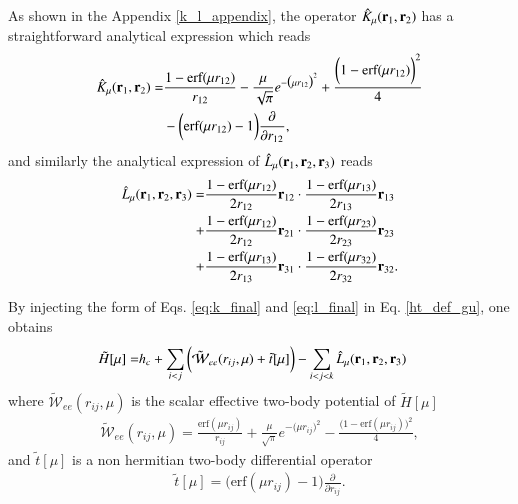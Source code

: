 \documentclass[aip,jcp,reprint,noshowkeys,superscriptaddress,twocolumn]{revtex4-1}
\newcommand{\deriv}[3]{\frac{\partial^{#3} #1}{\partial {#2}^{#3}}}
\newcommand{\bri}[1]{{\bf r}_{#1}}
\begin{document}
As shown in the Appendix \ref{k_l_appendix}, the operator $\hat{K}_\mu(\bri{1},\bri{2})$ has a straightforward analytical expression which reads 
\begin{equation}
 \label{eq:k_final}
  \begin{aligned}
   \hat{K}_\mu(\bri{1},\bri{2}) = & \frac{1 - \text{erf}(\mu r_{12})}{r_{12}} - \frac{\mu}{\sqrt{\pi}} e^{-\big(\mu r_{12} \big)^2} + \frac{\bigg(1 -     \text{erf}(\mu r_{12}) \bigg)^2}{4} \\
& - \bigg( \text{erf}(\mu r_{12}) - 1\bigg) \deriv{}{r_{12}}{},
  \end{aligned}
\end{equation}
and similarly the analytical expression of $\hat{L}_\mu(\bri{1},\bri{2},\bri{3}) $ reads 
\begin{equation}
 \label{eq:l_final}
 \begin{aligned}
 \hat{L}_\mu(\bri{1},\bri{2},\bri{3}) = & \frac{1 - \text{erf}(\mu r_{12})}{2 r_{12}} \bri{12} \cdot \frac{1 - \text{erf}(\mu r_{13})}{2 r_{13}} \bri{13} \\
                                      + & \frac{1 - \text{erf}(\mu r_{12})}{2 r_{12}} \bri{21} \cdot \frac{1 - \text{erf}(\mu r_{23})}{2 r_{23}} \bri{23} \\
                                      + & \frac{1 - \text{erf}(\mu r_{13})}{2 r_{13}} \bri{31} \cdot \frac{1 - \text{erf}(\mu r_{32})}{2 r_{32}} \bri{32}.
 \end{aligned}                    
\end{equation}

By injecting the form of Eqs. \eqref{eq:k_final} and \eqref{eq:l_final} in Eq. \eqref{ht_def_gu}, one obtains 
\begin{equation}
  \begin{aligned}
 \label{eq:exp_ht_mu}
   \tilde{H}[\mu] = & h_c + \sum_{i<j} \bigg( \tilde{\mathcal{W}}_{ee}(r_{ij},\mu) + \tilde{t}[\mu] \bigg) - \sum_{i<j<k} \hat{L}_\mu(\bri{1},\bri{2},\bri{3})
  \end{aligned}
\end{equation}
where $ \tilde{\mathcal{W}}_{ee}(r_{ij},\mu)$ is the scalar effective two-body potential of  $\tilde{H}[\mu]$
\begin{equation}
 \begin{aligned}
 \tilde{\mathcal{W}}_{ee}(r_{ij},\mu)  =  \frac{\text{erf}(\mu r_{ij})}{r_{ij}} + \frac{\mu}{\sqrt{\pi}} e^{-\big(\mu r_{ij} \big)^2} - \frac{\bigg(1 -     \text{erf}(\mu r_{ij}) \bigg)^2}{4}, 
 \end{aligned}
\end{equation}
and $\tilde{t}[\mu]$ is a non hermitian two-body differential operator 
\begin{equation}
 \begin{aligned}
 \tilde{t}[\mu] =  \bigg( \text{erf}(\mu r_{ij}) - 1\bigg) \deriv{}{r_{ij}}{}.
 \end{aligned}
\end{equation}
\end{document}
